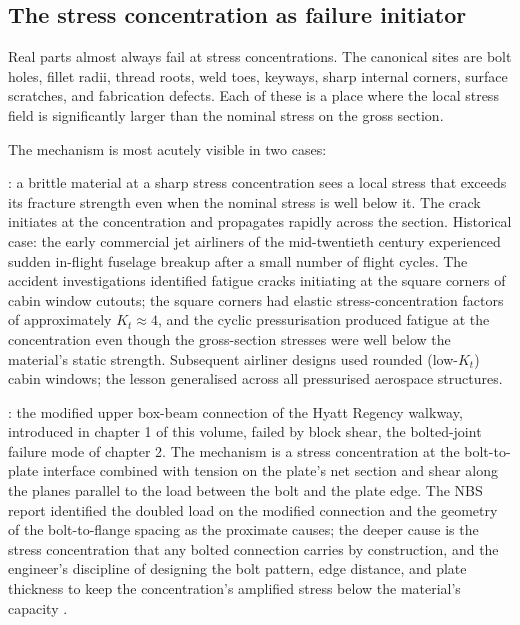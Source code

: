 \subsection{The stress concentration as failure initiator}

Real parts almost always fail at stress concentrations. The
canonical sites are bolt holes, fillet radii, thread roots, weld
toes, keyways, sharp internal corners, surface scratches, and
fabrication defects. Each of these is a place where the local
stress field is significantly larger than the nominal stress on
the gross section.

The mechanism is most acutely visible in two cases:

: a brittle material at
a sharp stress concentration sees a local stress that exceeds its
fracture strength even when the nominal stress is well below it.
The crack initiates at the concentration and propagates rapidly
across the section. Historical case: the early commercial jet
airliners of the mid-twentieth century experienced sudden in-flight
fuselage breakup after a small number of flight cycles. The accident
investigations identified fatigue cracks initiating at the square
corners of cabin window cutouts; the square corners had elastic
stress-concentration factors of approximately $K_t \approx 4$, and
the cyclic pressurisation produced fatigue at the concentration
even though the gross-section stresses were well below the
material's static strength. Subsequent airliner designs used
rounded (low-$K_t$) cabin windows; the lesson generalised across
all pressurised aerospace structures.

: the modified upper
box-beam connection of the Hyatt Regency walkway, introduced in
chapter 1 of this volume, failed by block shear, the bolted-joint
failure mode of chapter 2. The mechanism is a stress concentration
at the bolt-to-plate interface combined with tension on the
plate's net section and shear along the planes parallel to the
load between the bolt and the plate edge. The NBS report
identified the doubled load on the modified connection and the
geometry of the bolt-to-flange spacing as the proximate causes;
the deeper cause is the stress concentration that any bolted
connection carries by construction, and the engineer's discipline
of designing the bolt pattern, edge distance, and plate thickness
to keep the concentration's amplified stress below the material's
capacity \cite{acc:nbs-hyatt-1982}.

